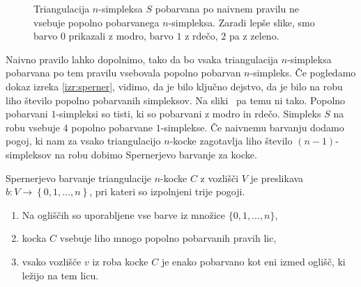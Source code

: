 \documentclass[mat1]{fmfdelo}
\newcommand{\0}{\underline{0}}
\begin{document}
\begin{figure}[h!]
	\centering
	\caption{Triangulacija $n$-simpleksa $S$ pobarvana po naivnem pravilu ne vsebuje popolno pobarvanega $n$-simpleksa. Zaradi lepše slike, smo barvo $0$ prikazali z modro, barvo $1$ z rdečo, $2$ pa z zeleno.}\label{fig:ni-pop}
\end{figure}
Naivno pravilo lahko dopolnimo, tako da bo vsaka triangulacija $n$-simpleksa pobarvana po tem pravilu vsebovala popolno pobarvan $n$-simpleks. Če pogledamo dokaz izreka \ref{izr:sperner}, vidimo, da je bilo ključno dejstvo, da je bilo na robu liho število popolno pobarvanih simpleksov. Na sliki~\label{fig:ni-pop} pa temu ni tako. Popolno pobarvani $1$-simpleksi so tisti, ki so pobarvani z modro in rdečo. Simpleks $S$ na robu vsebuje $4$ popolno pobarvane $1$-simplekse. Če naivnemu barvanju dodamo pogoj, ki nam za vsako triangulacijo $n$-kocke zagotavlja liho število $(n-1)$-simpleksov na robu dobimo Spernerjevo barvanje za kocke.
\begin{definicija}\label{def:cubsperner}
Spernerjevo barvanje triangulacije $n$-kocke $C$ z vozlišči $V$ je preslikava $b : V \to \left \{ 0, 1, \dots, n \right \}$, pri kateri so izpolnjeni trije pogoji.
\begin{enumerate}
\item Na ogliščih so uporabljene vse barve iz množice $\{ 0, 1, \dots, n \}$,
\item kocka $C$ vsebuje liho mnogo popolno pobarvanih pravih lic,
\item vsako vozlišče $v$ iz roba kocke $C$ je enako pobarvano kot eni izmed oglišč, ki ležijo na tem licu.
\end{enumerate}
\end{definicija}
\end{document}
